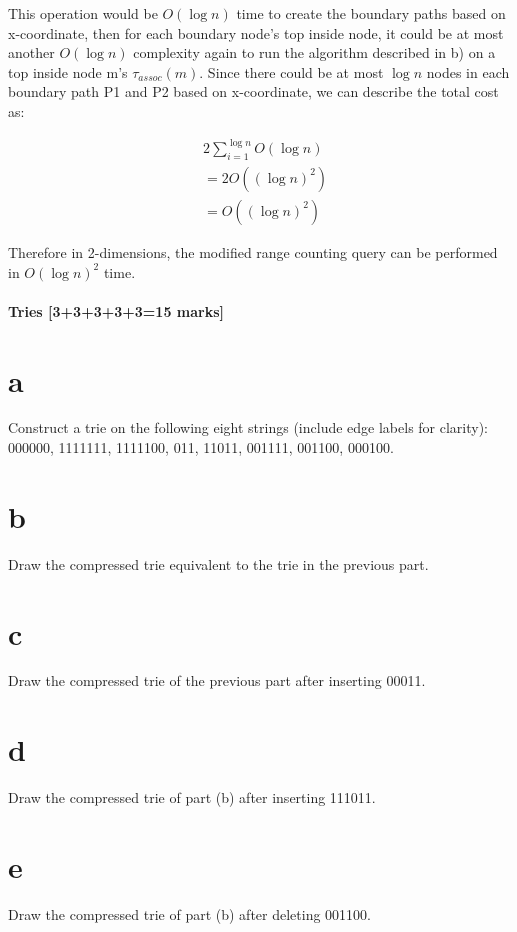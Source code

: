 \documentclass[12pt]{article}
\begin{document}
\begin{enumerate}
This operation would be $O(\log n)$ time to create the boundary paths based on x-coordinate, then for each boundary node's top inside node, it could be at most another $O(\log n)$ complexity again to run the algorithm described in b) on a top inside node m's $\tau_{assoc}(m)$. Since there could be at most $\log n$ nodes in each boundary path P1 and P2 based on x-coordinate, we can describe the total cost as:

\begin{align*}
  &2\sum_{i=1}^{\log n} O(\log n)\\
  &=2O((\log n)^2)\\
  &=O((\log n)^2)
\end{align*}

Therefore in 2-dimensions, the modified range counting query can be performed in $O(\log{n})^2$ time.
\end{enumerate}

\subsection{Tries [3+3+3+3+3=15 marks]}
\begin{itemize}
\part{a} Construct a trie on the following eight strings (include edge labels for clarity):\\ 000000, 1111111, 1111100, 011, 11011, 001111, 001100, 000100.
\part{b} Draw the compressed trie equivalent to the trie in the previous part.
\part{c} Draw the compressed trie of the previous part after inserting 00011.
\part{d} Draw the compressed trie of part (b) after inserting 111011.
\part{e} Draw the compressed trie of part (b) after deleting 001100.
\end{itemize}
\end{document}
